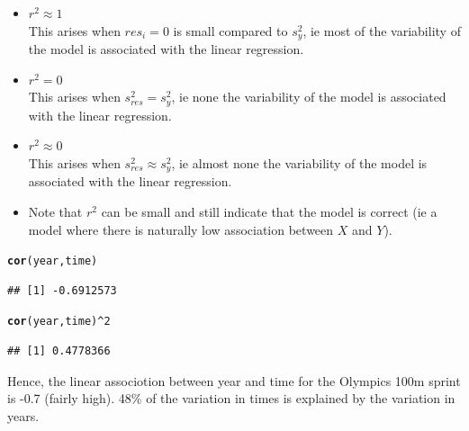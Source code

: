 \documentclass[t,xcolor=pdftex,dvipsnames,table]{beamer}
\makeatletter
\newcommand{\hlnum}[1]{\textcolor[rgb]{0.686,0.059,0.569}{#1}}%
\newcommand{\hlopt}[1]{\textcolor[rgb]{0,0,0}{#1}}%
\newcommand{\hlstd}[1]{\textcolor[rgb]{0.345,0.345,0.345}{#1}}%
\newcommand{\hlkwd}[1]{\textcolor[rgb]{0.737,0.353,0.396}{\textbf{#1}}}%
\newenvironment{kframe}{%
 \def\at@end@of@kframe{}%
 \ifinner\ifhmode%
  \def\at@end@of@kframe{\end{minipage}}%
  \begin{minipage}{\columnwidth}%
 \fi\fi%
 \def\FrameCommand##1{\hskip\@totalleftmargin \hskip-\fboxsep
 \colorbox{shadecolor}{##1}\hskip-\fboxsep
     \hskip-\linewidth \hskip-\@totalleftmargin \hskip\columnwidth}%
 \MakeFramed {\advance\hsize-\width
   \@totalleftmargin\z@ \linewidth\hsize
   \@setminipage}}%
 {\par\unskip\endMakeFramed%
 \at@end@of@kframe}
\newenvironment{knitrout}{}{} %
\makeatother
\begin{document}
\begin{frame}[fragile]{}

\begin{itemize}
\item  $r^2 \approx 1$ \\
This arises when $res_i=0$ is small compared to $s_{y}^2$, ie most of the variability of the model is associated with the linear regression.

\item $r^2=0$ \\
This arises when $s_{res}^2=s_{y}^2$, ie none the variability of the model is associated with the linear regression. 

\item $r^2 \approx 0$ \\
This arises when $s_{res}^2 \approx s_{y}^2$, ie almost none the variability of the model is associated with the linear regression. 

\item Note that $r^2$ can be small and still indicate that the model is correct (ie a model where there is naturally low association between $X$ and $Y$).

\end{itemize}
\end{frame} 

\begin{frame}[fragile]{}  
\begin{knitrout}
\color{fgcolor}\begin{kframe}
\begin{alltt}
\hlkwd{cor}\hlstd{(year,time)}
\end{alltt}
\begin{verbatim}
## [1] -0.6912573
\end{verbatim}
\begin{alltt}
\hlkwd{cor}\hlstd{(year,time)}\hlopt{^}\hlnum{2}
\end{alltt}
\begin{verbatim}
## [1] 0.4778366
\end{verbatim}
\end{kframe}
\end{knitrout}

Hence, the linear associotion between year and time for the Olympics 100m sprint is  -0.7 (fairly high). 48\% of the variation in times is explained by the variation in years.



\end{frame}
\end{document}

